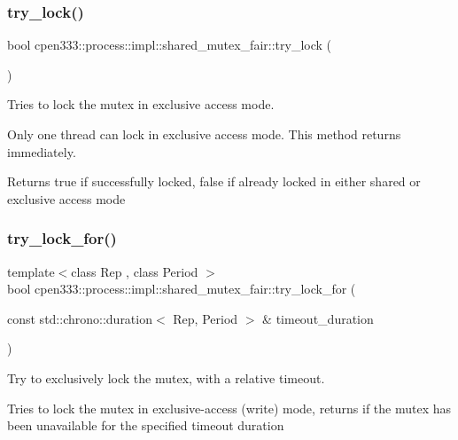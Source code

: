 \subsubsection{\texorpdfstring{try\+\_\+lock()}{try\_lock()}}
{\footnotesize\ttfamily bool cpen333\+::process\+::impl\+::shared\+\_\+mutex\+\_\+fair\+::try\+\_\+lock (\begin{DoxyParamCaption}{ }\end{DoxyParamCaption})\hspace{0.3cm}{\ttfamily [inline]}}



Tries to lock the mutex in exclusive access mode. 

Only one thread can lock in exclusive access mode. This method returns immediately.

\begin{DoxyReturn}{Returns}
true if successfully locked, false if already locked in either shared or exclusive access mode 
\end{DoxyReturn}
\mbox{\label{classcpen333_1_1process_1_1impl_1_1shared__mutex__fair_a949f9ed2c12c14bd2cade7ec96dd3adb}} 
\subsubsection{\texorpdfstring{try\+\_\+lock\+\_\+for()}{try\_lock\_for()}}
{\footnotesize\ttfamily template$<$class Rep , class Period $>$ \\
bool cpen333\+::process\+::impl\+::shared\+\_\+mutex\+\_\+fair\+::try\+\_\+lock\+\_\+for (\begin{DoxyParamCaption}\item[{const std\+::chrono\+::duration$<$ Rep, Period $>$ \&}]{timeout\+\_\+duration }\end{DoxyParamCaption})\hspace{0.3cm}{\ttfamily [inline]}}



Try to exclusively lock the mutex, with a relative timeout. 

Tries to lock the mutex in exclusive-\/access (write) mode, returns if the mutex has been unavailable for the specified timeout duration


